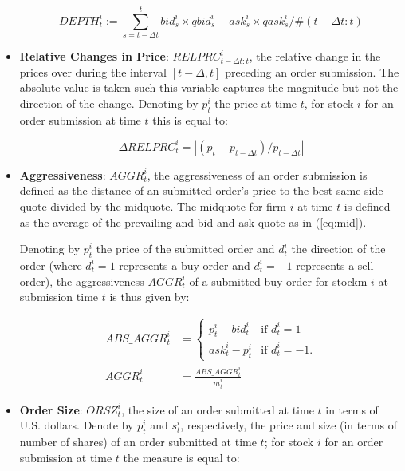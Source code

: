 \documentclass{article}
\begin{document}
\begin{itemize}
    \begin{equation*}
    DEPTH_{t}^i := \sum _{s=t-\Delta t} ^{t} bid_s ^i \times qbid_s^i+ask_s ^i \times qask_s^i / \#(t-\Delta t:t)
    \end{equation*}

\item \textbf{Relative Changes in Price}: $RELPRC_{t-\Delta t:t}^i$, the relative change in the prices over during the interval $[t-\Delta,t]$ preceding an order submission. The absolute value is taken such this variable captures the magnitude but not the direction of the change. Denoting by $p_t^i$ the price at time $t$, for stock $i$ for an order submission at time $t$ this is equal to:

    \begin{equation}\label{eq:qspr_pre}
    \Delta RELPRC_{t}^i = |(p_t - p_{t-\Delta t}) / p_{t-\Delta t}|
    \end{equation}

\item \textbf{Aggressiveness}: $AGGR_t^i$, the aggressiveness of an order submission is defined as the distance of an submitted order's price to the best same-side quote divided by the midquote. The midquote for firm $i$ at time $t$ is defined as the average of the prevailing and bid and ask quote as in (\ref{eq:mid}).

\noindent Denoting by $p_t^i$ the price of the submitted order and $d_t^i$ the direction of the order (where $d_t^i=1$ represents a buy order and $d_t^i=-1$ represents a sell order), the aggressiveness $AGGR_t^i$ of a submitted buy order for stockm $i$ at submission time $t$ is thus given by:

\begin{align*}
ABS\_AGGR_t^i&=\begin{cases} p_t^i - bid_t^i &\mbox{if } d_t^i=1 \\
ask_t^i - p_t^i & \mbox{if } d_t^i=-1. \end{cases} \\
AGGR_t^i &= \frac{ABS\_AGGR_t^i}{m_t^i}
\end{align*}

\item \textbf{Order Size}: $ORSZ_t^i$, the size of an order submitted at time $t$ in terms of U.S. dollars. Denote by $p_t^i$ and $s_t^i$, respectively, the price and size (in terms of number of shares) of an order submitted at time $t$; for stock $i$ for an order submission at time $t$ the measure is equal to:


\end{itemize}
\end{document}
